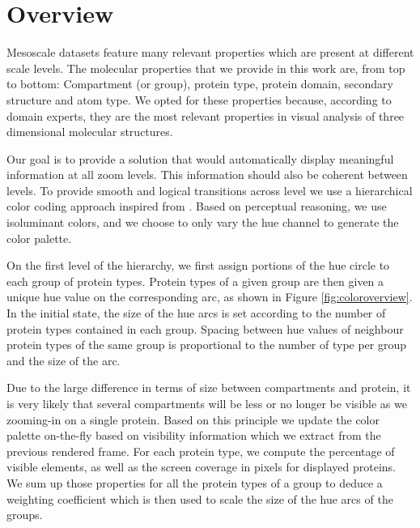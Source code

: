 \documentclass[review,journal]{vgtc}         %
\begin{document}
\section{Overview}
\label{Overview}


Mesoscale datasets feature many relevant properties which are present at different scale levels.
The molecular properties that we provide in this work are, from top to bottom: Compartment (or group), protein type, protein domain, secondary structure and atom type.
We opted for these properties because, according to domain experts, they are the most relevant properties in visual analysis of three dimensional molecular structures.


Our goal is to provide a solution that would automatically display meaningful information at all zoom levels.
This information should also be coherent between levels.
To provide smooth and logical transitions across level we use a hierarchical color coding approach inspired from \cite{tennekes2014tree}.
Based on perceptual reasoning, we use isoluminant colors, and we choose to only vary the hue channel to generate the color palette. 

On the first level of the hierarchy, we first assign portions of the hue circle to each group of protein types.
Protein types of a given group are then given a unique hue value on the corresponding arc, as shown in Figure \ref{fig:coloroverview}.
In the initial state, the size of the hue arcs is set according to the number of protein types contained in each group. 
Spacing between hue values of neighbour protein types of the same group is proportional to the number of type per group and the size of the arc. 

Due to the large difference in terms of size between compartments and protein, it is very likely that several compartments will be less or no longer be visible as we zooming-in on a single protein. 
Based on this principle we update the color palette on-the-fly based on visibility information which we extract from the previous rendered frame.
For each protein type, we compute the percentage of visible elements, as well as the screen coverage in pixels for displayed proteins.
We sum up those properties for all the protein types of a group to deduce a weighting coefficient which is then used to scale the size of the hue arcs of the groups.
\end{document}
